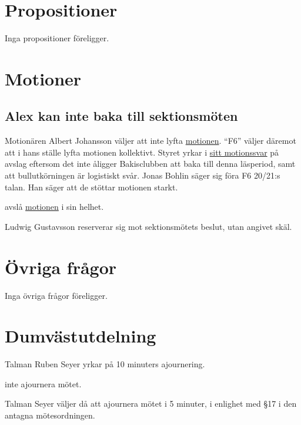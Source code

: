 \documentclass[hidelinks]{sektionsmote}
\begin{document}
\section{Propositioner}
Inga propositioner föreligger.

\section{Motioner}

\subsection{Alex kan inte baka till sektionsmöten}
Motionären Albert Johansson väljer att inte lyfta \hyperlink{bilagor/motion/a.pdf.1}{motionen}.
\enquote{F6} väljer däremot att i hans ställe lyfta motionen kollektivt.
Styret yrkar i \hyperlink{bilagor/motion/a-svar.pdf.1}{sitt motionssvar} på avslag eftersom det inte åligger Bakisclubben att baka till denna läsperiod, samt att bullutkörningen är logistiskt svår.
Jonas Bohlin säger sig föra F6 20/21:s talan.
Han säger att de stöttar motionen starkt.
\begin{beslut}
    \item avslå \hyperlink{bilagor/motion/a.pdf.1}{motionen} i sin helhet.
\end{beslut}
Ludwig Gustavsson reserverar sig mot sektionsmötets beslut, utan angivet skäl.

\section{Övriga frågor}
Inga övriga frågor föreligger.

\section{Dumvästutdelning}
\begin{ofraga}
    Talman Ruben Seyer yrkar på 10 minuters ajournering.
    \begin{beslut}
        \item inte ajournera mötet.
    \end{beslut}
    Talman Seyer väljer då att ajournera mötet i 5 minuter, i enlighet med §17 i den antagna mötesordningen.
\end{ofraga}
\end{document}
